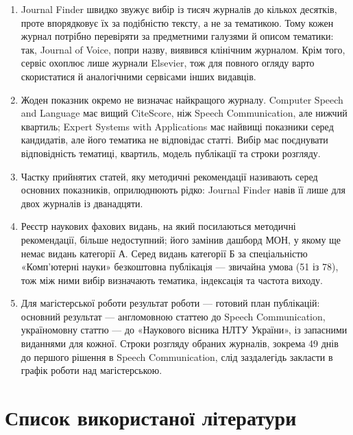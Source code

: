 \documentclass[14pt,a4paper]{extreport}
\begin{document}
\begin{enumerate}[ref=\arabic*]
\item Journal Finder швидко звужує вибір із тисяч журналів до кількох десятків, проте впорядковує їх за подібністю тексту, а не за тематикою. Тому кожен журнал потрібно перевіряти за предметними галузями й описом тематики: так, Journal of Voice, попри назву, виявився клінічним журналом. Крім того, сервіс охоплює лише журнали Elsevier, тож для повного огляду варто скористатися й аналогічними сервісами інших видавців.
\item Жоден показник окремо не визначає найкращого журналу. Computer Speech and Language має вищий CiteScore, ніж Speech Communication, але нижчий квартиль; Expert Systems with Applications має найвищі показники серед кандидатів, але його тематика не відповідає статті. Вибір має поєднувати відповідність тематиці, квартиль, модель публікації та строки розгляду.
\item Частку прийнятих статей, яку методичні рекомендації називають серед основних показників, оприлюднюють рідко: Journal Finder навів її лише для двох журналів із дванадцяти.
\item Реєстр наукових фахових видань, на який посилаються методичні рекомендації, більше недоступний; його замінив дашборд МОН, у якому ще немає видань категорії А. Серед видань категорії Б за спеціальністю «Комп'ютерні науки» безкоштовна публікація — звичайна умова (51 із 78), тож між ними вибір визначають тематика, індексація та частота виходу.
\item Для магістерської роботи результат роботи — готовий план публікацій: основний результат — англомовною статтею до Speech Communication, україномовну статтю — до «Наукового вісника НЛТУ України», із запасними виданнями для кожної. Строки розгляду обраних журналів, зокрема 49 днів до першого рішення в Speech Communication, слід заздалегідь закласти в графік роботи над магістерською.
\end{enumerate}

\section{Список використаної літератури}

\printbibliography[heading=none]
\end{document}

